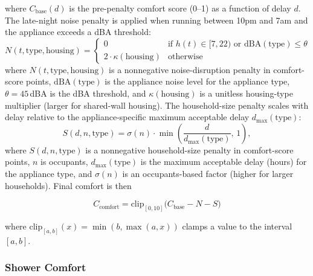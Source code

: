 \documentclass[final,3p,times]{elsarticle}
\begin{document}
\noindent where $C_{\mathrm{base}}(d)$ is the pre-penalty comfort score (0--1) as a function of delay $d$.
The late-night noise penalty is applied when running between 10pm and 7am and the appliance exceeds a dBA threshold:
\begin{equation}
  N(t,\mathrm{type},\mathrm{housing})=
  \begin{cases}
    0 & \text{if } h(t)\in[7,22) \text{ or } \mathrm{dBA}(\mathrm{type})\le \theta \\[3pt]
    2\cdot \kappa(\mathrm{housing}) & \text{otherwise}
  \end{cases}
  \label{eq:appliance_noise_penalty}
\end{equation}
\noindent where $N(t,\mathrm{type},\mathrm{housing})$ is a nonnegative noise-disruption penalty in comfort-score points, $\mathrm{dBA}(\mathrm{type})$ is the appliance noise level for the appliance type, $\theta = 45$\,dBA is the dBA threshold, and $\kappa(\mathrm{housing})$ is a unitless housing-type multiplier (larger for shared-wall housing).
The household-size penalty scales with delay relative to the appliance-specific maximum acceptable delay $d_{\max}(\mathrm{type})$:
\begin{equation}
  S(d,n,\mathrm{type})=\sigma(n)\cdot \min\!\left(\frac{d}{d_{\max}(\mathrm{type})},\,1\right),
  \label{eq:appliance_size_penalty}
\end{equation}
\noindent where $S(d,n,\mathrm{type})$ is a nonnegative household-size penalty in comfort-score points, $n$ is occupants, $d_{\max}(\mathrm{type})$ is the maximum acceptable delay (hours) for the appliance type, and $\sigma(n)$ is an occupants-based factor (higher for larger households).
Final comfort is then

\begin{equation}
    C_{\mathrm{comfort}}=\mathrm{clip}_{[0,10]}\!\bigl(C_{\mathrm{base}}-N-S\bigr)
\end{equation}

\noindent where $\mathrm{clip}_{[a,b]}(x)=\min(b,\max(a,x))$ clamps a value to the interval $[a,b]$.

\subsubsection{Shower Comfort}
\end{document}
